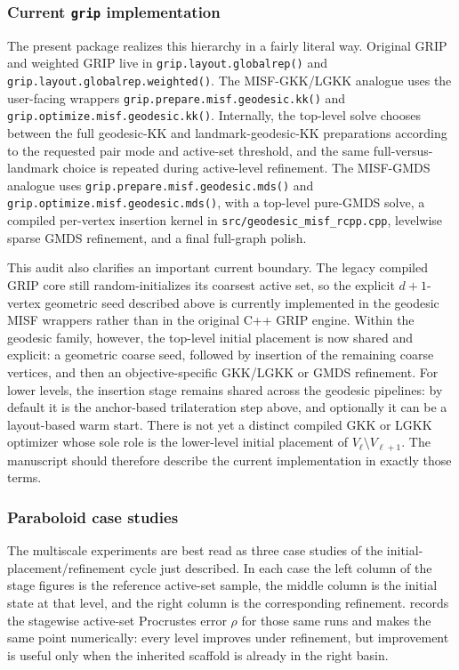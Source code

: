 \documentclass[11pt]{article}
\begin{document}
\subsubsection*{Current \texttt{grip} implementation}
The present package realizes this hierarchy in a fairly literal way.  Original
GRIP and weighted GRIP live in \texttt{grip.layout.globalrep()} and
\texttt{grip.layout.globalrep.weighted()}.  The MISF-GKK/LGKK analogue uses
the user-facing wrappers
\texttt{grip.prepare.\allowbreak misf.\allowbreak geodesic.\allowbreak kk()} and
\texttt{grip.optimize.\allowbreak misf.\allowbreak geodesic.\allowbreak kk()}.
Internally, the top-level solve
chooses between the full geodesic-KK and landmark-geodesic-KK preparations
according to the requested pair mode and active-set threshold, and the same
full-versus-landmark choice is repeated during active-level refinement.  The
MISF-GMDS analogue uses
\texttt{grip.prepare.\allowbreak misf.\allowbreak geodesic.\allowbreak mds()} and
\texttt{grip.optimize.\allowbreak misf.\allowbreak geodesic.\allowbreak mds()},
with a top-level pure-GMDS solve,
a compiled per-vertex insertion kernel in
\texttt{src/geodesic\_misf\_rcpp.cpp}, levelwise sparse GMDS refinement, and a
final full-graph polish.

This audit also clarifies an important current boundary.  The legacy compiled
GRIP core still random-initializes its coarsest active set, so the explicit
$d+1$-vertex geometric seed described above is currently implemented in the
geodesic MISF wrappers rather than in the original C++ GRIP engine.  Within the
geodesic family, however, the top-level initial placement is now shared and
explicit: a geometric coarse seed, followed by insertion of the remaining
coarse vertices, and then an objective-specific GKK/LGKK or GMDS refinement.
For lower levels, the insertion stage remains shared across the geodesic
pipelines: by default it is the anchor-based trilateration step above, and
optionally it can be a layout-based warm start.  There is not yet a distinct
compiled GKK or LGKK optimizer whose sole role is the lower-level initial
placement of $V_\ell \setminus V_{\ell+1}$.  The manuscript should therefore
describe the current implementation in exactly those terms.

\clearpage
\subsubsection*{Paraboloid case studies}
The multiscale experiments are best read as three case studies of the
initial-placement/refinement cycle just described.  In each case the left
column of the stage figures is the reference active-set sample, the middle
column is the initial state at that level, and the right column is the
corresponding refinement.   records the stagewise
active-set Procrustes error $\rho$ for those same runs and makes the same point
numerically: every level improves under refinement, but improvement is useful
only when the inherited scaffold is already in the right basin.
\end{document}
